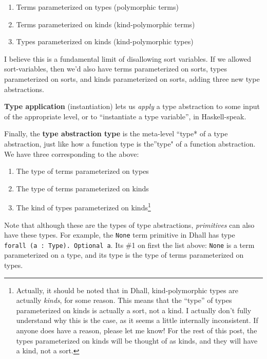 \documentclass[]{article}
\begin{document}
\begin{enumerate}
\def\labelenumi{\arabic{enumi}.}
\tightlist
\item
  Terms parameterized on types (polymorphic terms)
\item
  Terms parameterized on kinds (kind-polymorphic terms)
\item
  Types parameterized on kinds (kind-polymorphic types)
\end{enumerate}

I believe this is a fundamental limit of disallowing sort variables. If we
allowed sort-variables, then we'd also have terms parameterized on sorts, types
parameterized on sorts, and kinds parameterized on sorts, adding three new type
abstractions.

\textbf{Type application} (instantiation) lets us \emph{apply} a type
abstraction to some input of the appropriate level, or to ``instantiate a type
variable'', in Haskell-speak.

Finally, the \textbf{type abstraction type} is the meta-level ``type* of a type
abstraction, just like how a function type is the''type" of a function
abstraction. We have three corresponding to the above:

\begin{enumerate}
\def\labelenumi{\arabic{enumi}.}
\tightlist
\item
  The type of terms parameterized on types
\item
  The type of terms parameterized on kinds
\item
  The kind of types parameterized on kinds\footnote{Actually, it should be noted
    that in Dhall, kind-polymorphic types are actually \emph{kinds}, for some
    reason. This means that the ``type'' of types parameterized on kinds is
    actually a sort, not a kind. I actually don't fully understand why this is
    the case, as it seems a little internally inconsistent. If anyone does have
    a reason, please let me know! For the rest of this post, the types
    parameterized on kinds will be thought of as kinds, and they will have a
    kind, not a sort.}
\end{enumerate}

Note that although these are the types of type abstractions, \emph{primitives}
can also have these types. For example, the \texttt{None} term primitive in
Dhall has type \texttt{forall\ (a\ :\ Type).\ Optional\ a}. Its \#1 on first the
list above: \texttt{None} is a term parameterized on a type, and its type is the
type of terms parameterized on types.
\end{document}
